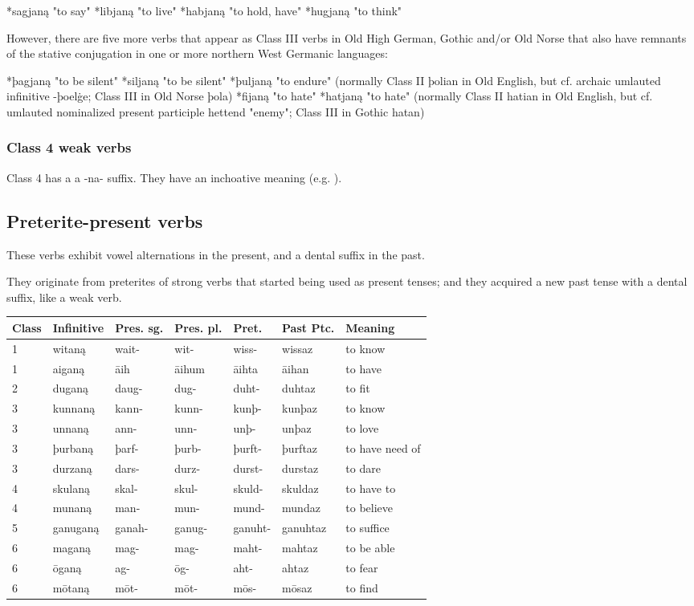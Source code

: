 \documentclass{article}
\begin{document}
    *sagjaną "to say"
    *libjaną "to live"
    *habjaną "to hold, have"
    *hugjaną "to think"

However, there are five more verbs that appear as Class III verbs in Old High German, Gothic and/or Old Norse that also have remnants of the stative conjugation in one or more northern West Germanic languages:

    *þagjaną "to be silent"
    *siljaną "to be silent"
    *þuljaną "to endure" (normally Class II þolian in Old English, but cf. archaic umlauted infinitive -þoelġe; Class III in Old Norse þola)
    *fijaną "to hate"
    *hatjaną "to hate" (normally Class II hatian in Old English, but cf. umlauted nominalized present participle hettend "enemy"; Class III in Gothic hatan)    

\subsubsection{Class 4 weak verbs}

Class 4 has a a -na- suffix. They have an inchoative meaning (e.g. ).

\subsection{Preterite-present verbs}

These verbs exhibit vowel alternations in the present, and a dental suffix in the past.

They originate from preterites of strong verbs that started being used as present tenses; and they acquired a new past tense with a dental suffix, like a weak verb.

\begin{center}
\begin{tabular}{|l l l l l l l|}
\hline
Class & Infinitive & Pres. sg. & Pres. pl. & Pret. & Past Ptc. & Meaning \\
\hline
1 & witaną & wait- & wit- & wiss- & wissaz & to know \\
1 & aiganą & āih & āihum & āihta & āihan & to have \\
2 & duganą & daug- & dug- & duht- & duhtaz & to fit \\
3 & kunnaną & kann- & kunn- & kunþ- & kunþaz & to know \\
3 & unnaną & ann- & unn- & unþ- & unþaz & to love \\
3 & þurbaną & þarf- & þurb- & þurft- & þurftaz & to have need of \\
3 & durzaną & dars- & durz- & durst- & durstaz & to dare \\
4 & skulaną & skal- & skul- & skuld- & skuldaz & to have to \\
4 & munaną & man- & mun- & mund- & mundaz & to believe \\
5 & ganuganą & ganah- & ganug- & ganuht- & ganuhtaz & to suffice \\
6 & maganą & mag- & mag- & maht- & mahtaz & to be able \\
6 & ōganą & ag- & ōg- & aht- & ahtaz & to fear \\
6 & mōtaną & mōt- & mōt- & mōs- & mōsaz & to find \\
\hline
\end{tabular}
\end{center}
\end{document}
